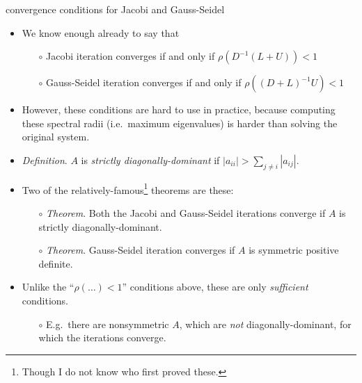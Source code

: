 \documentclass[10pt,hyperref]{beamer}
\begin{document}
\begin{frame}{convergence conditions for Jacobi and Gauss-Seidel}

\begin{itemize}
\item We know enough already to say that
  \begin{itemize}
  \item[$\circ$] Jacobi iteration converges if and only if $\rho(D^{-1} (L+U)) < 1$
  \item[$\circ$] Gauss-Seidel iteration converges if and only if $\rho((D+L)^{-1} U) < 1$
  \end{itemize}
\item However, these conditions are hard to use in practice, because computing these spectral radii (i.e.~maximum eigenvalues) is harder than solving the original system.
\item \emph{Definition}.  $A$ is \emph{strictly diagonally-dominant} if $|a_{ii}| > \sum_{j\ne i} |a_{ij}|$.
\item Two of the relatively-famous\footnote{Though I do not know who first proved these.}  theorems are these:
  \begin{itemize}
  \item[$\circ$] \emph{Theorem}.  Both the Jacobi and Gauss-Seidel iterations converge if $A$ is strictly diagonally-dominant.
  \item[$\circ$] \emph{Theorem}.  Gauss-Seidel iteration converges if $A$ is symmetric positive definite.
  \end{itemize}
\item Unlike the ``$\rho(\dots) < 1$'' conditions above, these are only \emph{sufficient} conditions.
  \begin{itemize}
  \item[$\circ$] E.g.~there are nonsymmetric $A$, which are \emph{not} diagonally-dominant, for which the iterations converge.
\end{itemize}
  \end{itemize}
\end{frame}
\end{document}
